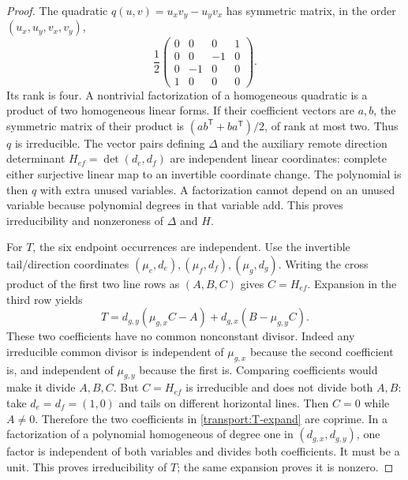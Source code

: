 \begin{proof}
The quadratic $q(u,v)=u_xv_y-u_yv_x$ has symmetric matrix, in the order
$(u_x,u_y,v_x,v_y)$,
\begin{equation}\label{transport:qmatrix}
 \frac12\begin{pmatrix}0&0&0&1\\0&0&-1&0\\0&-1&0&0\\1&0&0&0\end{pmatrix}.
\end{equation}
Its rank is four. A nontrivial factorization of a homogeneous quadratic is
a product of two homogeneous linear forms. If their coefficient vectors are
$a,b$, the symmetric matrix of their product is
$(ab^{\mathsf T}+ba^{\mathsf T})/2$, of rank at most two. Thus $q$ is
irreducible. The vector pairs defining $\Delta$ and the auxiliary remote
direction determinant $H_{ef}=\det(d_e,d_f)$ are independent linear coordinates:
complete either surjective linear map to an invertible coordinate change.
The polynomial is then $q$ with extra unused variables. A factorization cannot
depend on an unused variable because polynomial degrees in that variable add.
This proves irreducibility and nonzeroness of $\Delta$ and $H$.

For $T$, the six endpoint occurrences are independent. Use the invertible
tail/direction coordinates $(\mu_e,d_e),(\mu_f,d_f),(\mu_g,d_g)$.
Writing the cross product of the first two line rows as $(A,B,C)$ gives
$C=H_{ef}$. Expansion in the third row yields
\begin{equation}\label{transport:T-expand}
 T=d_{g,y}(\mu_{g,x}C-A)+d_{g,x}(B-\mu_{g,y}C).
\end{equation}
These two coefficients have no common nonconstant divisor. Indeed any
irreducible common divisor is independent of $\mu_{g,x}$ because the second
coefficient is, and independent of $\mu_{g,y}$ because the first is.
Comparing coefficients would make it divide $A,B,C$. But $C=H_{ef}$ is
irreducible and does not divide both $A,B$: take $d_e=d_f=(1,0)$ and tails on
different horizontal lines. Then $C=0$ while $A\ne0$. Therefore the two
coefficients in \eqref{transport:T-expand} are coprime. In a factorization
of a polynomial homogeneous of degree one in $(d_{g,x},d_{g,y})$, one factor
is independent of both variables and divides both coefficients. It must be
a unit. This proves irreducibility of $T$; the same expansion proves it is
nonzero.


\end{proof}
